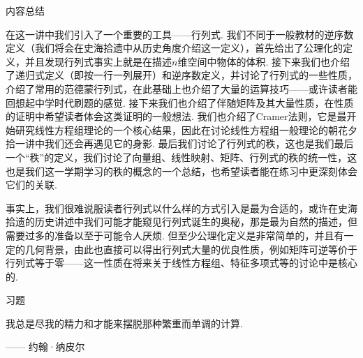 \vspace{2ex}
\centerline{\heiti \Large 内容总结}

在这一讲中我们引入了一个重要的工具——行列式. 我们不同于一般教材的逆序数定义（我们将会在史海拾遗中从历史角度介绍这一定义），首先给出了公理化的定义，并且发现行列式事实上就是在描述$n$维空间中物体的体积. 接下来我们也介绍了递归式定义（即按一行一列展开）和逆序数定义，并讨论了行列式的一些性质，介绍了常用的范德蒙行列式，在此基础上也介绍了大量的运算技巧——或许读者能回想起中学时代刷题的感觉. 接下来我们也介绍了伴随矩阵及其大量性质，在性质的证明中希望读者体会这类证明的一般想法. 我们也介绍了Cramer法则，它是最开始研究线性方程组理论的一个核心结果，因此在讨论线性方程组一般理论的朝花夕拾一讲中我们还会再遇见它的身影. 最后我们讨论了行列式的秩，这也是我们最后一个``秩''的定义，我们讨论了向量组、线性映射、矩阵、行列式的秩的统一性，这也是我们这一学期学习的秩的概念的一个总结，也希望读者能在练习中更深刻体会它们的关联.

事实上，我们很难说服读者行列式以什么样的方式引入是最为合适的，或许在史海拾遗的历史讲述中我们可能才能窥见行列式诞生的奥秘，那是最为自然的描述，但需要过多的准备以至于可能令人厌烦. 但至少公理化定义是非常简单的，并且有一定的几何背景，由此也直接可以得出行列式大量的优良性质，例如矩阵可逆等价于行列式等于零——这一性质在将来关于线性方程组、特征多项式等的讨论中是核心的.

\vspace{2ex}
\centerline{\heiti \Large 习题}

\vspace{2ex}
{\kaishu 我总是尽我的精力和才能来摆脱那种繁重而单调的计算. }
\begin{flushright}
    \kaishu
    —— 约翰·纳皮尔
\end{flushright}

